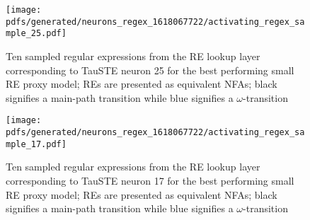 \begin{figure}[t!]
  \centering
  \texttt{[image: pdfs/generated/neurons\_regex\_1618067722/activating\_regex\_sample\_25.pdf]}
  \caption{Ten sampled regular expressions from the RE lookup layer
    corresponding to TauSTE neuron 25 for the best performing small RE proxy
    model; REs are presented as equivalent NFAs; black signifies a
    main-path transition while blue signifies a $\omega$-transition}
  \label{fig:regex_example_neuron_reminder}
\end{figure}

\begin{figure}[t!]
  \centering
  \texttt{[image: pdfs/generated/neurons\_regex\_1618067722/activating\_regex\_sample\_17.pdf]}
  \caption{Ten sampled regular expressions from the RE lookup layer
    corresponding to TauSTE neuron 17 for the best performing small RE proxy
    model; REs are presented as equivalent NFAs; black signifies a
    main-path transition while blue signifies a $\omega$-transition}
  \label{fig:regex_example_neuron_weather}
\end{figure}

\clearpage

